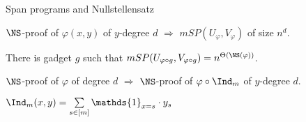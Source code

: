 \begin{frame}{Span programs and Nullstellensatz}

    \begin{lemma}
        $\NS$-proof of $\varphi(x, y)$ of $y$-degree $d$ $\Rightarrow$ $mSP(U_{\varphi}, V_{\varphi})$ of
        size $n^d$.
    \end{lemma}

    \pause

    \begin{lemma}
        There is gadget $g$ such that $mSP(U_{\varphi \circ g}, V_{\varphi \circ g}) =
        n^{\Theta(\NS(\varphi))}$.
    \end{lemma}

    \pause

    \begin{lemma}
        $\NS$-proof of $\varphi$ of degree $d$ $\Rightarrow$ $\NS$-proof of $\varphi \circ \Ind_m$ of
        $y$-degree $d$.
    \end{lemma}

    $\Ind_m(x, y) = \sum\limits_{s \in [m]} \mathds{1}_{x = s} \cdot y_s$
\end{frame}


